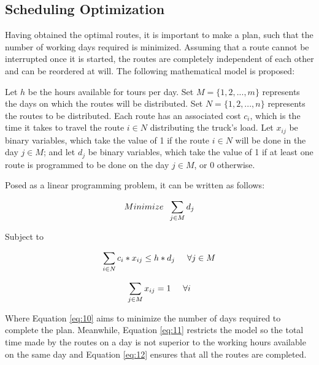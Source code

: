 \documentclass{amsart}
\begin{document}
        
        \subsection{Scheduling Optimization}\label{OrderRoutes}
        Having obtained the optimal routes, it is important to make a plan, such that the number of working days required is minimized. Assuming that a route cannot be interrupted once it is started, the routes are completely independent of each other and can be reordered at will. The following mathematical model is proposed:
        
        Let $h$ be the hours available for tours per day. Set $M=\{1, 2, ... , m\}$ represents the days on which the routes will be distributed. Set $N = \{1, 2, ..., n\}$ represents the routes to be distributed. Each route has an associated cost $c_i$, which is the time it takes to travel the route $i \in N$ distributing the truck's load. Let $x_{ij}$ be binary variables, which take the value of 1 if the route $i\in N$ will be done in the day $j \in M$; and let $d_j$ be binary variables, which take the value of 1 if at least one route is programmed to be done on the day $j \in M$, or 0 otherwise.
        
        Posed as a linear programming problem, it can be written as follows:
        
        \begin{equation} \label{eq:10}
            Minimize \hspace{0.2cm} \sum_{j \in M} d_j
        \end{equation}
        
        Subject \hspace{0.07cm} to \hspace{0.2cm} 
        
        \begin{equation} \label{eq:11}
            \sum_{i \in N} c_i*x_{ij} \leq h * d_j \hspace{0.5cm} \forall j \in M
        \end{equation}

        \begin{equation} \label{eq:12}
            \sum_{j \in M} x_{ij} = 1 \hspace{0.5cm} \forall i
        \end{equation}
        
        Where Equation \ref{eq:10} aims to minimize the number of days required to complete the plan. Meanwhile, Equation \ref{eq:11} restricts the model so the total time made by the routes on a day is not superior to the working hours available on the same day and Equation \ref{eq:12} ensures that all the routes are completed.
\end{document}
